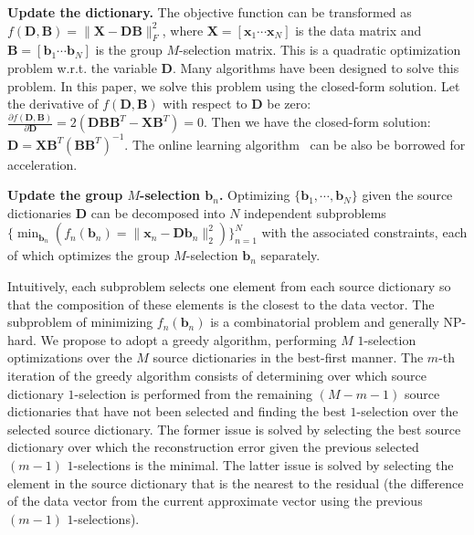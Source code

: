\documentclass[10pt, letterpaper]{article}
\begin{document}
\noindent\textbf{Update the dictionary.}
The objective function can be transformed
as $f(\mathbf{D}, \mathbf{B}) = \|\mathbf{X} - \mathbf{D}\mathbf{B}\|_F^2$,
where $\mathbf{X} = [\mathbf{x}_1\cdots \mathbf{x}_N]$
is the data matrix
and $\mathbf{B} = [\mathbf{b}_1 \cdots \mathbf{b}_N]$
is the group $M$-selection matrix.
This is a quadratic optimization problem
w.r.t. the variable $\mathbf{D}$.
Many algorithms have been designed to solve this problem.
In this paper,
we solve this problem using the closed-form solution.
Let the derivative of $f(\mathbf{D}, \mathbf{B})$
with respect to $\mathbf{D}$ be zero:
$\frac{\partial f(\mathbf{D}, \mathbf{B})}{ \partial \mathbf{D}}
= 2 (\mathbf{D}\mathbf{B}\mathbf{B}^T - \mathbf{X}\mathbf{B}^T) = 0$.
Then we have the closed-form solution:
$\mathbf{D} = \mathbf{X}\mathbf{B}^T(\mathbf{B}\mathbf{B}^T)^{-1}$.
The online learning algorithm~\cite{MairalBPS09}
can be also be borrowed for acceleration.



\noindent\textbf{Update the group $M$-selection $\mathbf{b}_n$.}
Optimizing $\{\mathbf{b}_1, \cdots, \mathbf{b}_N\}$
given the source dictionaries $\mathbf{D}$
can be decomposed into $N$ independent subproblems
$\{\min_{\mathbf{b}_n} (f_n(\mathbf{b}_n) =  \|\mathbf{x}_n - \mathbf{D}\mathbf{b}_n\|_2^2)\}_{n=1}^N$
with the associated constraints,
each of which optimizes the group $M$-selection $\mathbf{b}_n$ separately.

Intuitively, each subproblem selects one element from each
source dictionary so that the composition of these elements is
the closest to the data vector. The subproblem of minimizing
$f_n(\mathbf{b}_n)$ is a combinatorial problem and generally
NP-hard. We propose to adopt a greedy algorithm, performing $M$
$1$-selection optimizations over the $M$ source dictionaries in
the best-first manner.
The $m$-th iteration of the greedy
algorithm consists of
determining over which source dictionary
$1$-selection is performed
from the remaining $(M-m-1)$ source
dictionaries that have not been selected and finding the best
$1$-selection over the selected source dictionary. The former
issue is solved by selecting the best source dictionary over
which the reconstruction error given the previous selected
$(m-1)$ $1$-selections is the minimal. The latter issue is
solved by selecting the element in the source dictionary that
is the nearest to the residual (the difference of the data
vector from the current approximate vector using the previous
$(m-1)$ $1$-selections).
\end{document}
